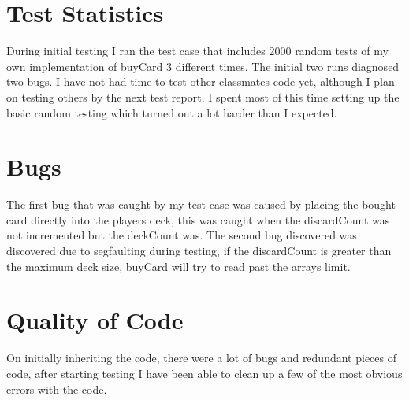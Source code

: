 \documentclass[letterpaper,12pt]{article}
\begin{document}
\section{Test Statistics}
During initial testing I ran the test case that includes 2000 random tests of my own
implementation of buyCard 3 different times. The initial two runs diagnosed two bugs. 
I have not had time to test other classmates code yet, although I plan on testing 
others by the next test report. I spent most of this time setting up the basic random 
testing which turned out a lot harder than I expected. 

\section{Bugs}
The first bug that was caught by my test case was caused by placing the bought card 
directly into the players deck, this was caught when the discardCount was not incremented 
but the deckCount was. The second bug discovered was discovered due to segfaulting during 
testing, if the discardCount is greater than the maximum deck size, buyCard will try to read
past the arrays limit.

\section{Quality of Code}
On initially inheriting the code, there were a lot of bugs and redundant pieces of code,
after starting testing I have been able to clean up a few of the most obvious errors with 
the code. 
\end{document}

